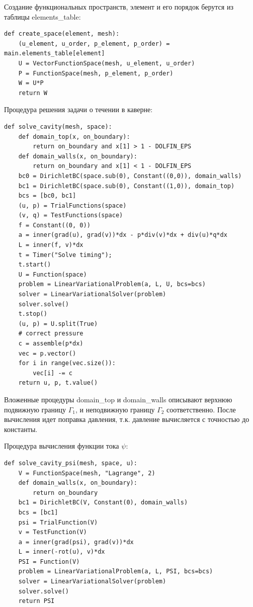 \documentclass[12pt]{article}
\begin{document}
Создание функциональных пространств, элемент и его порядок берутся из таблицы elements\_table:
\begin{lstlisting}
def create_space(element, mesh):
    (u_element, u_order, p_element, p_order) = main.elements_table[element]
    U = VectorFunctionSpace(mesh, u_element, u_order)
    P = FunctionSpace(mesh, p_element, p_order)
    W = U*P
    return W
\end{lstlisting}

Процедура решения задачи о течении в каверне: 
\begin{lstlisting}       
def solve_cavity(mesh, space):
    def domain_top(x, on_boundary):
        return on_boundary and x[1] > 1 - DOLFIN_EPS  
    def domain_walls(x, on_boundary):
        return on_boundary and x[1] < 1 - DOLFIN_EPS    
    bc0 = DirichletBC(space.sub(0), Constant((0,0)), domain_walls)
    bc1 = DirichletBC(space.sub(0), Constant((1,0)), domain_top)
    bcs = [bc0, bc1]    
    (u, p) = TrialFunctions(space)
    (v, q) = TestFunctions(space)
    f = Constant((0, 0))       
    a = inner(grad(u), grad(v))*dx - p*div(v)*dx + div(u)*q*dx
    L = inner(f, v)*dx    
    t = Timer("Solve timing");
    t.start()            
    U = Function(space)
    problem = LinearVariationalProblem(a, L, U, bcs=bcs)
    solver = LinearVariationalSolver(problem)
    solver.solve()    
    t.stop()    
    (u, p) = U.split(True)        
    # correct pressure
    c = assemble(p*dx)
    vec = p.vector()
    for i in range(vec.size()):
        vec[i] -= c
    return u, p, t.value()
\end{lstlisting}
Вложенные процедуры domain\_top и domain\_walls описывают верхнюю подвижную границу $\Gamma_1$, и неподвижную границу $\Gamma_2$ соответственно. После вычисления идет поправка давления, т.к. давление вычисляется с точностью до константы.

Процедура вычисления функции тока $\psi$:
\begin{lstlisting}
def solve_cavity_psi(mesh, space, u):
    V = FunctionSpace(mesh, "Lagrange", 2)
    def domain_walls(x, on_boundary):
        return on_boundary
    bc1 = DirichletBC(V, Constant(0), domain_walls)    
    bcs = [bc1]
    psi = TrialFunction(V)
    v = TestFunction(V)    
    a = inner(grad(psi), grad(v))*dx
    L = inner(-rot(u), v)*dx    
    PSI = Function(V)
    problem = LinearVariationalProblem(a, L, PSI, bcs=bcs)
    solver = LinearVariationalSolver(problem)
    solver.solve()
    return PSI
\end{lstlisting}
\end{document}
